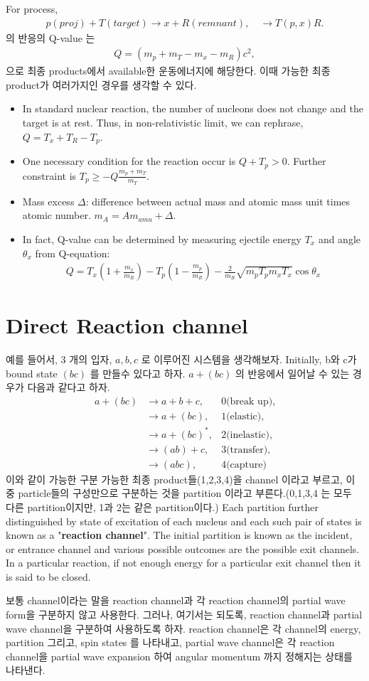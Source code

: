 \documentclass[11pt]{book}
\newcommand{\bea}{\begin{eqnarray}}
\newcommand{\eea}{\end{eqnarray}}
\newcommand{\no}{\nonumber \\}
\begin{document}
For process,
\bea 
p(proj)+T(target)\to x+R(remnant),\quad \rightarrow T(p,x)R.
\eea 
의 반응의 Q-value 는
\bea 
Q=(m_p+m_T-m_x-m_R)c^2, 
\eea 
으로 최종 products에서 available한 운동에너지에 해당한다. 이때 가능한 최종 product가 
여러가지인 경우를 생각할 수 있다. 

\begin{itemize}
	\item In standard nuclear reaction, the number of nucleons does not change
	and the target is at rest. 
	Thus, in non-relativistic limit, we can rephrase,
	$Q=T_x+T_R-T_p$.
	\item One necessary condition for the reaction occur is $Q+T_p>0$.
	      Further constraint is $T_p \geq -Q\frac{m_p+m_T}{m_T}$.
	\item Mass excess $\Delta$: difference between actual mass and atomic mass unit times atomic number. 
	     $m_A= A m_{amu}+\Delta$. 
	\item In fact, Q-value can be determined by measuring ejectile energy $T_x$ and angle $\theta_x$
	  from Q-equation:   
	  \bea 
	  Q= T_x(1+\frac{m_x}{m_R})-T_p(1-\frac{m_p}{m_R})-\frac{2}{m_R}\sqrt{m_p T_p m_x T_x}\cos\theta_x 
	  \eea    
\end{itemize}



\section{Direct Reaction channel} 
예를 들어서, 3 개의 입자, $a,b,c$ 로 이루어진 시스템을 생각해보자. Initially, b와 c가 bound state
$(bc)$ 를 만들수 있다고 하자. $a+(bc)$ 의 반응에서 일어날 수 있는 경우가 다음과 같다고 하자.
\bea 
a+(bc) &\to a+b+c , &\mbox{0(break up)},\no 
       &\to a+(bc), &\mbox{1(elastic)},\no 
       &\to a+(bc)^*,&\mbox{2(inelastic)},\no 
       &\to (ab)+c ,&\mbox{3(transfer)},\no 
       &\to (abc) ,&\mbox{4(capture)} 
\eea 
이와 같이 가능한 구분 가능한 최종 product들(1,2,3,4)을 channel 이라고 부르고, 
이 중 particle들의 구성만으로 구분하는 것을 partition 이라고 부른다.(0,1,3,4 는
모두 다른 partition이지만, 1과 2는 같은 partition이다.)
Each partition further distinguished by state of excitation of each
nucleus and each such pair of states is known as a "{\bf reaction
channel}".
The initial partition is known
as the incident, or entrance channel and various possible
outcomes are the possible exit channels.
In a particular reaction, if not enough energy for a particular exit
channel then it is said to be closed.

보통 channel이라는 말을 reaction channel과 각 reaction channel의 partial wave form을 
구분하지 않고 사용한다. 그러나, 여기서는 되도록, reaction channel과 partial wave channel을 
구분하여 사용하도록 하자. reaction channel은 각 channel의 energy, partition 그리고, 
spin states 를 나타내고, partial wave channel은 각 reaction channel을 partial wave expansion 
하여 angular momentum 까지 정해지는 상태를 나타낸다. 
\end{document}
